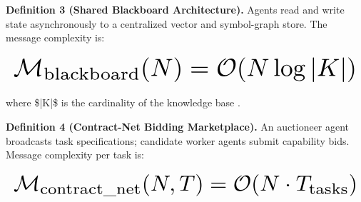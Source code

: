\documentclass{article}
\begin{document}
\textbf{Definition 3 (Shared Blackboard Architecture).} Agents read and write state asynchronously to a centralized vector and symbol-graph store. The message complexity is:






















\begin{equation}
\resizebox{\columnwidth}{!}{$\displaystyle
\begin{aligned}
\mathcal{M}_{\text{blackboard}}(N) = \mathcal{O}(N \log |K|)
\end{aligned}
$}
\end{equation}






















where \$|K|\$ is the cardinality of the knowledge base \cite{crossref_10_1145_3689096_3689462}.

\textbf{Definition 4 (Contract-Net Bidding Marketplace).} An auctioneer agent broadcasts task specifications; candidate worker agents submit capability bids. Message complexity per task is:






















\begin{equation}
\resizebox{\columnwidth}{!}{$\displaystyle
\begin{aligned}
\mathcal{M}_{\text{contract\_net}}(N, T) = \mathcal{O}(N \cdot T_{\text{tasks}})
\end{aligned}
$}
\end{equation}
\end{document}
